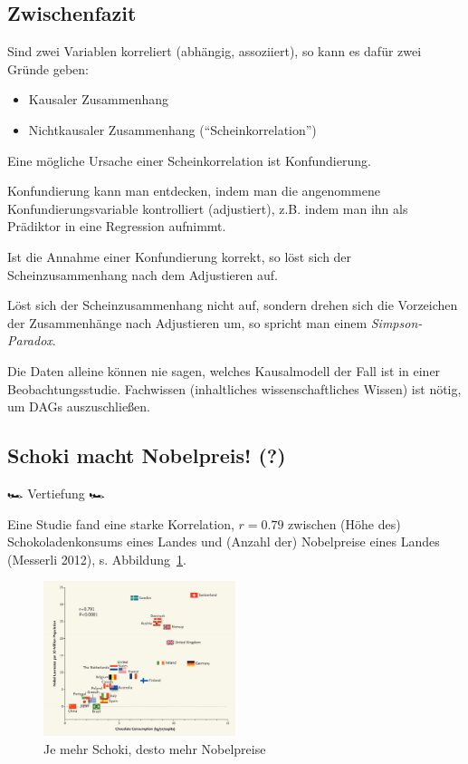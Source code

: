 \documentclass[
  a4paper,
  DIV=11]{scrreprt}
\providecommand{\tightlist}{%
  \setlength{\itemsep}{0pt}\setlength{\parskip}{0pt}}\usepackage{longtable,booktabs,array}
\theoremstyle{definition}
\theoremstyle{remark}
\begin{document}
\hypertarget{zwischenfazit-1}{%
\subsection{Zwischenfazit}\label{zwischenfazit-1}}

Sind zwei Variablen korreliert (abhängig, assoziiert), so kann es dafür
zwei Gründe geben:

\begin{itemize}
\tightlist
\item
  Kausaler Zusammenhang
\item
  Nichtkausaler Zusammenhang (``Scheinkorrelation'')
\end{itemize}

Eine mögliche Ursache einer Scheinkorrelation ist Konfundierung.

Konfundierung kann man entdecken, indem man die angenommene
Konfundierungsvariable kontrolliert (adjustiert), z.B. indem man ihn als
Prädiktor in eine Regression aufnimmt.

Ist die Annahme einer Konfundierung korrekt, so löst sich der
Scheinzusammenhang nach dem Adjustieren auf.

Löst sich der Scheinzusammenhang nicht auf, sondern drehen sich die
Vorzeichen der Zusammenhänge nach Adjustieren um, so spricht man einem
\emph{Simpson-Paradox}.

Die Daten alleine können nie sagen, welches Kausalmodell der Fall ist in
einer Beobachtungsstudie. Fachwissen (inhaltliches wissenschaftliches
Wissen) ist nötig, um DAGs auszuschließen.

\hypertarget{schoki-macht-nobelpreis}{%
\subsection{Schoki macht Nobelpreis!
(?)}\label{schoki-macht-nobelpreis}}

🏎️ Vertiefung 🏎️

Eine Studie fand eine starke Korrelation, \(r=0.79\) zwischen (Höhe des)
Schokoladenkonsums eines Landes und (Anzahl der) Nobelpreise eines
Landes (Messerli 2012), s. Abbildung~\ref{fig-schoki}.

\begin{figure}

{\centering \includegraphics[width=0.5\textwidth,height=\textheight]{./img/correlation_550.png}

}

\caption{\label{fig-schoki}Je mehr Schoki, desto mehr Nobelpreise}

\end{figure}
\end{document}
